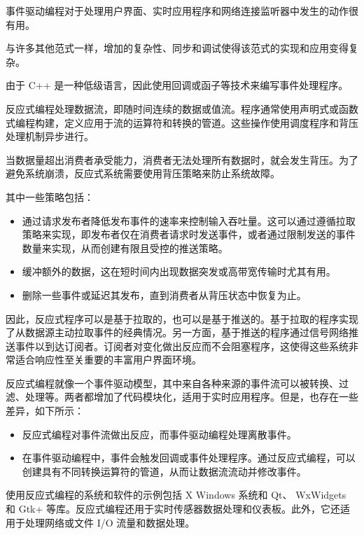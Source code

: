 事件驱动编程对于处理用户界面、实时应用程序和网络连接监听器中发生的动作很有用。

与许多其他范式一样，增加的复杂性、同步和调试使得该范式的实现和应用变得复杂。

由于 C++ 是一种低级语言，因此使用回调或函子等技术来编写事件处理程序。


反应式编程处理数据流，即随时间连续的数据或值流。程序通常使用声明式或函数式编程构建，定义应用于流的运算符和转换的管道。这些操作使用调度程序和背压处理机制异步进行。

当数据量超出消费者承受能力，消费者无法处理所有数据时，就会发生背压。为了避免系统崩溃，反应式系统需要使用背压策略来防止系统故障。

其中一些策略包括：

\begin{itemize}
\item
通过请求发布者降低发布事件的速率来控制输入吞吐量。这可以通过遵循拉取策略来实现，即发布者仅在消费者请求时发送事件，或者通过限制发送的事件数量来实现，从而创建有限且受控的推送策略。

\item
缓冲额外的数据，这在短时间内出现数据突发或高带宽传输时尤其有用。

\item
删除一些事件或延迟其发布，直到消费者从背压状态中恢复为止。
\end{itemize}

因此，反应式程序可以是基于拉取的，也可以是基于推送的。基于拉取的程序实现了从数据源主动拉取事件的经典情况。另一方面，基于推送的程序通过信号网络推送事件以到达订阅者。订阅者对变化做出反应而不会阻塞程序，这使得这些系统非常适合响应性至关重要的丰富用户界面环境。

反应式编程就像一个事件驱动模型，其中来自各种来源的事件流可以被转换、过滤、处理等。两者都增加了代码模块化，适用于实时应用程序。但是，也存在一些差异，如下所示：

\begin{itemize}
\item
反应式编程对事件流做出反应，而事件驱动编程处理离散事件。

\item
在事件驱动编程中，事件会触发回调或事件处理程序。通过反应式编程，可以创建具有不同转换运算符的管道，从而让数据流流动并修改事件。
\end{itemize}

使用反应式编程的系统和软件的示例包括 X Windows 系统和 Qt、 WxWidgets 和 Gtk+ 等库。反应式编程还用于实时传感器数据处理和仪表板。此外，它还适用于处理网络或文件 I/O 流量和数据处理。

